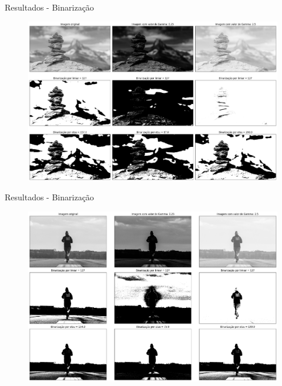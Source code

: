 \documentclass[]{beamer}
\begin{document}
\begin{frame}{Resultados - Binarização}
    \begin{figure}
        \includegraphics[scale=0.23]{Imagens/resultados-binarizacao-cairn.png}
    \end{figure}  
\end{frame}

\begin{frame}{Resultados - Binarização}
    \begin{figure}
        \includegraphics[scale=0.23]{Imagens/resultados-binarizacao-runner.png}
    \end{figure}  
\end{frame}
\end{document}
